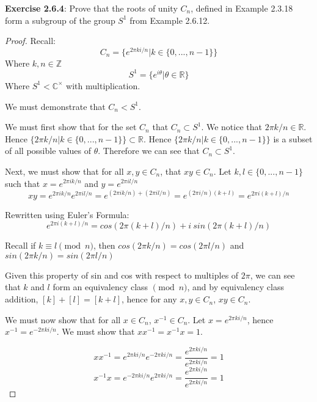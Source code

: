 \documentclass[a4paper]{article}
\begin{document}
\begin{myparindent}{0pt}
\textbf{Exercise 2.6.4}:
Prove that the roots of unity $C_n$, defined in Example 2.3.18 form a subgroup
of the group $S^1$ from Example 2.6.12. \newline
\begin{proof}
  Recall:
  \[ C_n = \{ e^{2 \pi ki / n} | k \in \{ 0, ..., n - 1 \} \} \]
  Where $k, n \in \mathbb{Z}$
  \[ S^1 = \{ e^{i \theta} | \theta \in \mathbb{R} \} \]
  Where $S^1 < \mathbb{C}^{\times}$ with multiplication. \newline

  We must demonstrate that $C_n < S^1$. \newline

  We must first show that for the set $C_n$ that $C_n \subset S^1$.
  We notice that $2 \pi k/n \in \mathbb{R}$. Hence $\{ 2 \pi k/n | k \in \{ 0, ..., n - 1 \} \} \subset \mathbb{R}$.
  Hence $\{ 2 \pi k/n | k \in \{ 0, ..., n - 1 \} \}$ is a subset of all possible values of $\theta$.
  Therefore we can see that $C_n \subset S^1$. \newline

  Next, we must show that for all $x, y \in C_n$, that $xy \in C_n$.
  Let $k, l \in \{ 0, ..., n - 1 \}$ such that $x = e^{2 \pi ik/n}$ and
  $y = e^{2 \pi il/n}$
  \[ xy = e^{2 \pi ik/n}  e^{2 \pi il/n} = e^{(2 \pi ik/n) + (2 \pi il/n)} = e^{(2\pi i/n)(k + l)} = e^{2\pi i (k + l) / n} \]

  Rewritten using Euler's Formula:
  \[ e^{2\pi i (k + l) / n} = cos(2\pi (k + l) / n) + i\ sin(2\pi (k + l) / n) \]

  Recall if $k \equiv l \pmod{n}$, then $cos(2 \pi k/n) = cos(2 \pi l/n)$ and
  $sin(2 \pi k/n) = sin(2 \pi l/n)$ \newline

  Given this property of sin and cos with respect to multiples of $2 \pi$, we
  can see that $k$ and $l$ form an equivalency class $\pmod n$, and by
  equivalency class addition, $[k] + [l] = [k + l]$,
  hence for any $x, y \in C_n$, $xy \in C_n$. \newline

  We must now show that for all $x \in C_n$, $x^{-1} \in C_n$.
  Let $x = e^{2 \pi k i / n}$, hence $x^{-1} = e^{-2 \pi k i / n}$.
  We must show that $xx^{-1} = x^{-1}x = 1$.

  \[ xx^{-1} = e^{2 \pi k i / n} e^{-2 \pi k i / n} = \frac{e^{2 \pi k i / n}}{e^{2 \pi k i / n}} = 1 \]
  \[ x^{-1}x = e^{-2 \pi k i / n} e^{2 \pi k i / n} = \frac{e^{2 \pi k i / n}}{e^{2 \pi k i / n}} = 1 \]


\end{proof}
\end{myparindent}
\end{document}
